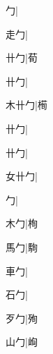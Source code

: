 \begin{multicols}{2}
{{勹}\mktsJzrVerticalBar{}{\cjk{}{\cnsym{}　}{\cnsym{}　}{\cnsym{}　}}|{}\par
{\cjk{}{\cnsym{}　}走勹}\mktsJzrVerticalBar{}{\cjk{}{\cnsym{}　}{\cnsym{}　}{\cnsym{}　}}|{}\par
{\cjk{}{\cnsym{}　}卄勹}\mktsJzrVerticalBar{}{\cjk{}{\cnsym{}　}{\cnsym{}　}{\cnsym{}　}}|{\cjk{}荀}\par
{卄勹}\mktsJzrVerticalBar{}{\cjk{}{\cnsym{}　}{\cnsym{}　}{\cnsym{}　}}|{}\par
{\cjk{}木卄勹}\mktsJzrVerticalBar{}{\cjk{}{\cnsym{}　}{\cnsym{}　}{\cnsym{}　}}|{\cjk{}槆}\par
{卄勹}\mktsJzrVerticalBar{}{\cjk{}{\cnsym{}　}{\cnsym{}　}{\cnsym{}　}}|{}\par
{卄勹}\mktsJzrVerticalBar{}{\cjk{}{\cnsym{}　}{\cnsym{}　}{\cnsym{}　}}|{}\par
{\cjk{}女卄勹}\mktsJzrVerticalBar{}{\cjk{}{\cnsym{}　}{\cnsym{}　}{\cnsym{}　}}|{}\par
{勹}\mktsJzrVerticalBar{}{\cjk{}{\cnsym{}　}{\cnsym{}　}{\cnsym{}　}}|{}\par
{\cjk{}{\cnsym{}　}木勹}\mktsJzrVerticalBar{}{\cjk{}{\cnsym{}　}{\cnsym{}　}{\cnsym{}　}}|{\cjk{}栒}\par
{\cjk{}{\cnsym{}　}馬勹}\mktsJzrVerticalBar{}{\cjk{}{\cnsym{}　}{\cnsym{}　}{\cnsym{}　}}|{\cjk{}駨}\par
{\cjk{}{\cnsym{}　}車勹}\mktsJzrVerticalBar{}{\cjk{}{\cnsym{}　}{\cnsym{}　}{\cnsym{}　}}|{}\par
{\cjk{}{\cnsym{}　}石勹}\mktsJzrVerticalBar{}{\cjk{}{\cnsym{}　}{\cnsym{}　}{\cnsym{}　}}|{}\par
{\cjk{}{\cnsym{}　}歹勹}\mktsJzrVerticalBar{}{\cjk{}{\cnsym{}　}{\cnsym{}　}{\cnsym{}　}}|{\cjk{}殉}\par
{\cjk{}{\cnsym{}　}山勹}\mktsJzrVerticalBar{}{\cjk{}{\cnsym{}　}{\cnsym{}　}{\cnsym{}　}}|{\cjk{}峋}\par
}
\end{multicols}
